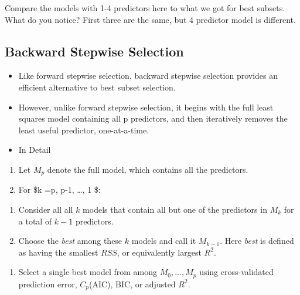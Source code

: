 \documentclass[
]{article}
\providecommand{\tightlist}{%
  \setlength{\itemsep}{0pt}\setlength{\parskip}{0pt}}
\begin{document}
Compare the models with 1-4 predictors here to what we got for best
subsets. What do you notice? First three are the same, but 4 predictor
model is different.

\hypertarget{backward-stepwise-selection}{%
\subsection{Backward Stepwise
Selection}\label{backward-stepwise-selection}}

\begin{itemize}
\item
  Like forward stepwise selection, backward stepwise selection provides
  an efficient alternative to best subset selection.
\item
  However, unlike forward stepwise selection, it begins with the full
  least squares model containing all p predictors, and then iteratively
  removes the least useful predictor, one-at-a-time.
\item
  In Detail
\end{itemize}

\begin{enumerate}
\def\labelenumi{\arabic{enumi}.}
\tightlist
\item
  Let \(M_p\) denote the full model, which contains all the predictors.
\item
  For \$k =p, p-1, \ldots, 1 \$:
\end{enumerate}

\begin{enumerate}
\def\labelenumi{\alph{enumi}.}
\tightlist
\item
  Consider all all \(k\) models that contain all but one of the
  predictors in \(M_k\) for a total of \(k-1\) predictors.
\item
  Choose the \emph{best} among these \(k\) models and call it
  \(M_{k-1}\). Here \emph{best} is defined as having the smallest
  \(RSS\), or equivalently largest \(R^2\).
\end{enumerate}

\begin{enumerate}
\def\labelenumi{\arabic{enumi}.}
\setcounter{enumi}{2}
\tightlist
\item
  Select a single best model from among \(M_0,...,M_p\) using
  cross-validated prediction error, \(C_p\)(AIC), BIC, or adjusted
  \(R^2\).
\end{enumerate}
\end{document}
